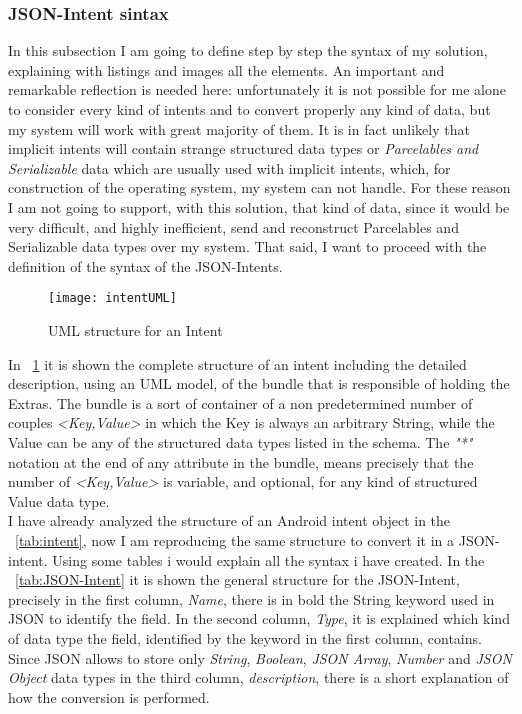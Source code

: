 \subsubsection{JSON-Intent sintax}
In this subsection I am going to define step by step the syntax of my solution, explaining with listings and images all the elements.
An important and remarkable reflection is needed here: unfortunately it is not possible for me alone to consider every kind of intents and to convert properly any kind of data, but my system will work with great majority of them. It is in fact unlikely that implicit intents will contain strange structured data types or \textit{Parcelables and Serializable} data which are usually used with implicit intents, which, for construction of the operating system, my system can not handle. For these reason I am not going to support, with this solution, that kind of data, since it would be very difficult, and highly inefficient, send and reconstruct Parcelables and Serializable data types over my system. That said, I want to proceed with the definition of the syntax of the JSON-Intents.\\
\begin{figure}[h]
	\centering
	\texttt{[image: intentUML]}
	\caption{UML  structure for an Intent}
	\label{fig:4.4}
\end{figure}
In \figurename~\ref{fig:4.4} it is shown the complete structure of an intent including the detailed description, using an UML model, of the bundle that is responsible of holding the Extras. The bundle is a sort of container of a non predetermined number of couples \textit{<Key,Value>} in which the Key is always an arbitrary String, while the Value can be any of the structured data types listed in the schema.
The \textit{"*"} notation at the end of any attribute in the bundle, means precisely that the number of \textit{<Key,Value>} is variable, and optional, for any kind of structured Value data type.\\
I have already analyzed the structure of an Android intent object in the \tablename~\ref{tab:intent}, now I am reproducing the same structure to convert it in a JSON-intent. Using some tables i would explain all the syntax i have created. In the \tablename~\ref{tab:JSON-Intent} it is shown the general structure for the JSON-Intent, precisely in the first column, \textit{Name}, there is in bold the String keyword used in JSON to identify the field. In the second column, \textit{Type}, it is explained which kind of data type the field, identified by the keyword in the first column, contains. Since JSON allows to store only \textit{String},	\textit{Boolean}, \textit{JSON Array}, \textit{Number} and \textit{JSON Object} data types in the third column, \textit{description}, there is a short explanation of how the conversion is performed.
